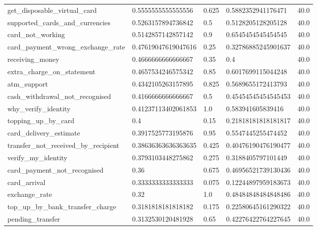 \begin{table}[!ht]
\begin{tabularx}{\textwidth}{X l l l l}
get\_disposable\_virtual\_card & \num{0.5555555555555556} & \num{0.625} & \num{0.5882352941176471} & \num{40.0} \\
supported\_cards\_and\_currencies & \num{0.5263157894736842} & \num{0.5} & \num{0.5128205128205128} & \num{40.0} \\
card\_not\_working & \num{0.5142857142857142} & \num{0.9} & \num{0.6545454545454545} & \num{40.0} \\
card\_payment\_wrong\_exchange\_rate & \num{0.47619047619047616} & \num{0.25} & \num{0.32786885245901637} & \num{40.0} \\
receiving\_money & \num{0.4666666666666667} & \num{0.35} & \num{0.4} & \num{40.0} \\
extra\_charge\_on\_statement & \num{0.4657534246575342} & \num{0.85} & \num{0.6017699115044248} & \num{40.0} \\
atm\_support & \num{0.4342105263157895} & \num{0.825} & \num{0.5689655172413793} & \num{40.0} \\
cash\_withdrawal\_not\_recognised & \num{0.4166666666666667} & \num{0.5} & \num{0.45454545454545453} & \num{40.0} \\
why\_verify\_identity & \num{0.41237113402061853} & \num{1.0} & \num{0.583941605839416} & \num{40.0} \\
topping\_up\_by\_card & \num{0.4} & \num{0.15} & \num{0.21818181818181817} & \num{40.0} \\
card\_delivery\_estimate & \num{0.3917525773195876} & \num{0.95} & \num{0.5547445255474452} & \num{40.0} \\
transfer\_not\_received\_by\_recipient & \num{0.38636363636363635} & \num{0.425} & \num{0.40476190476190477} & \num{40.0} \\
verify\_my\_identity & \num{0.3793103448275862} & \num{0.275} & \num{0.3188405797101449} & \num{40.0} \\
card\_payment\_not\_recognised & \num{0.36} & \num{0.675} & \num{0.46956521739130436} & \num{40.0} \\
card\_arrival & \num{0.3333333333333333} & \num{0.075} & \num{0.12244897959183673} & \num{40.0} \\
exchange\_rate & \num{0.32} & \num{1.0} & \num{0.48484848484848486} & \num{40.0} \\
top\_up\_by\_bank\_transfer\_charge & \num{0.3181818181818182} & \num{0.175} & \num{0.22580645161290322} & \num{40.0} \\
pending\_transfer & \num{0.3132530120481928} & \num{0.65} & \num{0.42276422764227645} & \num{40.0} \\

\end{tabularx}
\end{table}
